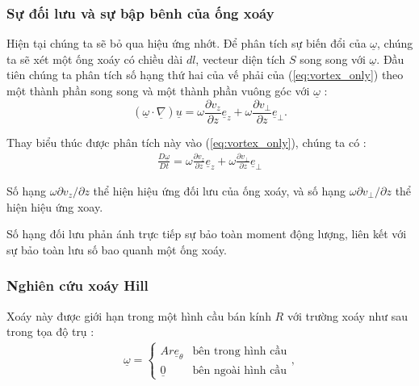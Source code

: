 \documentclass[CO_LUU_CHAT.tex]{subfiles}
\begin{document}
	
	
\subsubsection{Sự đối lưu và sự bập bênh của ống xoáy}

	Hiện tại chúng ta sẽ bỏ qua hiệu ứng nhớt. Để phân tích sự biến đổi của $\underline{\omega}$, chúng ta sẽ xét một ống xoáy có chiều dài $dl$, vecteur diện tích $S$ song song với $\underline{\omega}$. Đầu tiên chúng ta phân tích số hạng thứ hai của vế phải của (\ref{eq:vortex_only}) theo một thành phần song song và một thành phần vuông góc với $\underline{\omega}$ :
		$$
			\left( {\underline \omega \cdot \underline {\nabla} } \right)\underline u=\omega\frac{\partial v_z}{\partial z}\underline{e}_z+\omega\frac{\partial v_\bot}{\partial z}\underline{e}_\bot.
		$$

	Thay biểu thúc được phân tích này vào (\ref{eq:vortex_only}), chúng ta có :
		\begin{equation}\label{eq:vortex_only_}
			\begin{aligned}
				\frac{{D\underline \omega  }}{{Dt}}= \omega\frac{\partial v_z}{\partial z}\underline{e}_z+\omega\frac{\partial v_\bot}{\partial z}\underline{e}_\bot
			\end{aligned}
		\end{equation}

	Số hạng $\omega{\partial v_z}/{\partial z}$ thể hiện hiệu ứng đối lưu của ống xoáy, và số hạng $\omega{\partial v_\bot}/{\partial z}$ thể hiện hiệu ứng xoay.

	Số hạng đối lưu phản ánh trực tiếp sự bảo toàn moment động lượng, liên kết với sự bảo toàn lưu số bao quanh một ống xoáy.

\subsubsection{Nghiên cứu xoáy Hill}
	Xoáy này được giới hạn trong một hình cầu bán kính $R$ với trường xoáy như sau trong tọa độ trụ :
		\begin{equation}
			\begin{aligned}
				\underline{\omega}=\begin{cases}
						Ar\underline{e}_\theta & \text{bên trong hình cầu}\\
						\underline{0} & \text{bên ngoài hình cầu}
					\end{cases},
			\end{aligned}
		\end{equation}
\end{document}
